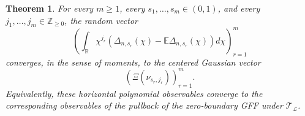 \documentclass[11pt]{amsart}
\theoremstyle{plain}
\newtheorem{theorem}{Theorem}
\numberwithin{equation}{section}
\numberwithin{theorem}{section}
\numberwithin{figure}{section}
\begin{document}
\begin{theorem}
For every $m\geq1$, every $s_1,\ldots,s_m\in(0,1)$, and every
$j_1,\ldots,j_m\in\mathbb Z_{\geq0}$, the random vector
\begin{equation}
    \left(
        \int_{\mathbb R}\chi^{j_r}
        \left(
            \Delta_{n,s_r}(\chi)
            -\mathbb E\Delta_{n,s_r}(\chi)
        \right)d\chi
    \right)_{r=1}^{m}
    \label{eq:gff-observable-vector}
\end{equation}
converges, in the sense of moments, to the centered Gaussian vector
\begin{equation}
    \left(
        \Xi(\nu_{s_r,j_r})
    \right)_{r=1}^{m}.
    \label{eq:gff-limit-vector}
\end{equation}
Equivalently, these horizontal polynomial observables converge to the
corresponding observables of the pullback of the zero-boundary GFF under
$\mathcal T_{\mathcal L}$.
\end{theorem}
\end{document}
